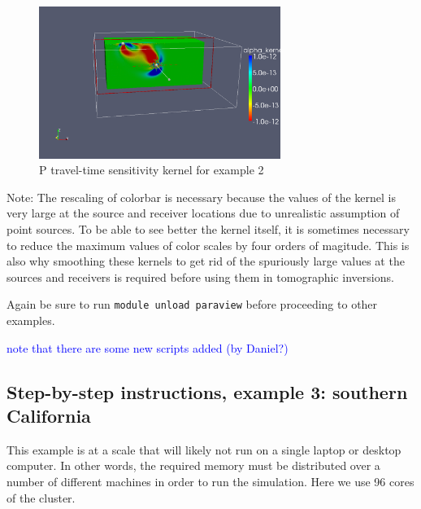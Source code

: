 \documentclass[10pt,fleqn,letterpaper]{article}
\newcommand{\blue}[1]{\textcolor{blue}{#1}}
\begin{document}
\begin{enumerate}
\begin{figure}[h]
\begin{center}
\includegraphics[width=0.7\textwidth]{homogeneous_halfspace_P_kernel.png}
\end{center}
\caption{P travel-time sensitivity kernel for example 2}
\end{figure}

 Note: The rescaling of colorbar is necessary because the values of the kernel is very large at the source and receiver locations due to unrealistic assumption of point sources. To be able to see better the kernel itself, it is sometimes necessary to reduce the maximum values of color scales by four orders of magitude. This is also why smoothing these kernels to get rid of the spuriously large values at the sources and receivers is required before using them in tomographic inversions.
   
Again be sure to run \verb+module unload paraview+ before proceeding to other examples.

\end{enumerate}

\blue{note that there are some new scripts added (by Daniel?)}



\subsection*{Step-by-step instructions, example 3: southern California}

This example is at a scale that will likely not run on a single laptop or desktop computer. In other words, the required memory must be distributed over a number of different machines in order to run the simulation. Here we use 96 cores of the cluster.
\end{document}
